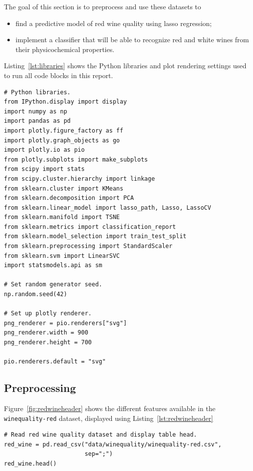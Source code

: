 \documentclass[12pt]{article}
\begin{document}
  The goal of this section is to preprocess and use these datasets to
  \begin{itemize}
    \item find a predictive model of red wine quality using lasso regression;
    \item implement a classifier that will be able to recognize red and white
      wines from their physicochemical properties.
  \end{itemize}

  Listing~\ref{lst:libraries} shows the Python libraries and plot rendering
  settings used to run all code blocks in this report.

  \begin{lstlisting}[caption={Python libraries import.}, captionpos=b,
    label={lst:libraries}]
# Python libraries.
from IPython.display import display
import numpy as np
import pandas as pd
import plotly.figure_factory as ff
import plotly.graph_objects as go
import plotly.io as pio
from plotly.subplots import make_subplots
from scipy import stats
from scipy.cluster.hierarchy import linkage
from sklearn.cluster import KMeans
from sklearn.decomposition import PCA
from sklearn.linear_model import lasso_path, Lasso, LassoCV
from sklearn.manifold import TSNE
from sklearn.metrics import classification_report
from sklearn.model_selection import train_test_split 
from sklearn.preprocessing import StandardScaler
from sklearn.svm import LinearSVC
import statsmodels.api as sm

# Set random generator seed.
np.random.seed(42)

# Set up plotly renderer.
png_renderer = pio.renderers["svg"]
png_renderer.width = 900
png_renderer.height = 700

pio.renderers.default = "svg"
  \end{lstlisting}

  \newpage

  \subsection{Preprocessing}

  Figure~\ref{fig:redwineheader} shows the different features available in the
  \lstinline{winequality-red} dataset, displayed using
  Listing~\ref{lst:redwineheader}

  \begin{lstlisting}[caption={Print red wine dataset header.}, captionpos=b,
    label={lst:redwineheader}]
# Read red wine quality dataset and display table head.
red_wine = pd.read_csv("data/winequality/winequality-red.csv", 
                       sep=";")
red_wine.head()
  \end{lstlisting}
\end{document}
